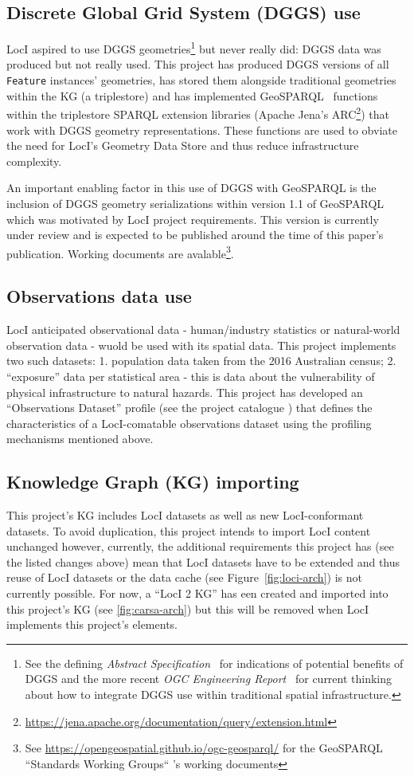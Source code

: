 \documentclass[runningheads]{llncs}
\begin{document}
\subsection{Discrete Global Grid System (DGGS) use}
LocI aspired to use DGGS geometries\footnote{See the defining \textit{Abstract Specification}~\cite{purss_topic_2017} for indications of potential benefits of 
DGGS and the more recent \textit{OGC Engineering Report}~\cite{gibb_ogc_2021} for current thinking about how to integrate DGGS use within traditional spatial 
infrastructure.} but never really did: DGGS data was produced but not really used. This project has produced DGGS versions of all \texttt{Feature} instances' 
geometries, has stored them alongside traditional geometries within the KG (a triplestore) and has implemented GeoSPARQL~\cite{open2012ogc} functions
within the triplestore SPARQL extension libraries (Apache Jena's ARC\footnote{\url{https://jena.apache.org/documentation/query/extension.html}}) that work with 
DGGS geometry representations. These functions are used to obviate the need for LocI's Geometry Data Store and thus reduce infrastructure complexity.

An important enabling factor in this use of DGGS with GeoSPARQL is the inclusion of DGGS geometry serializations within version 1.1 of GeoSPARQL which was motivated
by LocI project requirements. This version is currently under review and is expected to be published around the time of this paper's publication. Working documents 
are avalable\footnote{See \url{https://opengeospatial.github.io/ogc-geosparql/} for the GeoSPARQL ``Standards Working Groups`` 's working documents}.

\subsection{Observations data use}
LocI anticipated observational data - human/industry statistics or natural-world observation data - wuold be used with its spatial data. This project
implements two such datasets: 1. population data taken from the 2016 Australian census; 2. ``exposure'' data per statistical area - this is data about the vulnerability
of physical infrastructure to natural hazards. This project has developed an ``Observations Dataset'' profile (see the project catalogue ) that defines the characteristics of a LocI-comatable 
observations dataset using the profiling mechanisms mentioned above.

\subsection{Knowledge Graph (KG) importing}
This project's KG includes LocI datasets as well as new LocI-conformant datasets. To avoid duplication, this project intends to import LocI content unchanged however, 
currently, the additional requirements this project has (see the listed changes above) mean that LocI datasets have to be extended and thus reuse of LocI datasets
or the data cache (see Figure~\ref{fig:loci-arch}) is not currently possible. For now, a ``LocI 2 KG'' has een created and imported into this project's KG (see 
\ref{fig:carsa-arch}) but this will be removed when LocI implements this project's elements.
\end{document}
